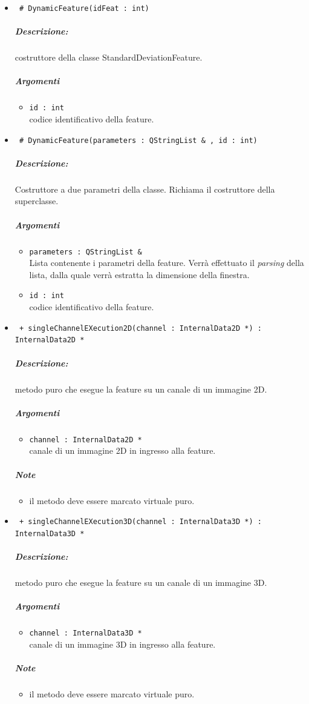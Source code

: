 	\begin{itemize}
	\item \color{blue}\verb! # DynamicFeature(idFeat : int)!
		\color{black}
		\subparagraph{Descrizione:} costruttore della classe StandardDeviationFeature.
		\subparagraph{Argomenti}
			\begin{itemize}
				\item \color{RoyalPurple} \verb!id : int! \\ 
				\color{black} codice identificativo della feature\g{}.	
			\end{itemize}
			
	\item \color{blue}\verb! # DynamicFeature(parameters : QStringList & , id : int)!
		\color{black}
		\subparagraph{Descrizione:} Costruttore a due parametri della classe. Richiama il costruttore della 						superclasse.
		\subparagraph{Argomenti}
			\begin{itemize}	
				\item \color{RoyalPurple} \verb!parameters : QStringList &! \\ 
				\color{black} Lista contenente i parametri della feature\g{}. Verrà effettuato il \textit{parsing} 						della lista, dalla quale verrà estratta la dimensione della finestra.
				\item \color{RoyalPurple} \verb!id : int! \\ 
				\color{black} codice identificativo della feature\g{}.	
			\end{itemize}

	\item \color{blue}\verb! + singleChannelEXecution2D(channel : InternalData2D *) : InternalData2D *!
		\color{black}
		\subparagraph{Descrizione:} metodo puro che esegue la feature su un canale di un immagine 2D.
		\subparagraph{Argomenti}
			\begin{itemize}
				\item \color{RoyalPurple} \verb!channel : InternalData2D * ! \\ 
				\color{black} canale di un immagine 2D in ingresso alla feature.		
			\end{itemize}
		\subparagraph{Note}
			\begin{itemize}
				\item il metodo deve essere marcato virtuale puro.
			\end{itemize}
			
	\item \color{blue}\verb! + singleChannelEXecution3D(channel : InternalData3D *) : InternalData3D *!
		\color{black}
		\subparagraph{Descrizione:} metodo puro che esegue la feature su un canale di un immagine 3D.
		\subparagraph{Argomenti}
			\begin{itemize}
				\item \color{RoyalPurple} \verb!channel : InternalData3D * ! \\ 
				\color{black} canale di un immagine 3D in ingresso alla feature.		
			\end{itemize}
		\subparagraph{Note}
			\begin{itemize}
				\item il metodo deve essere marcato virtuale puro.
			\end{itemize}
			

\end{itemize}
